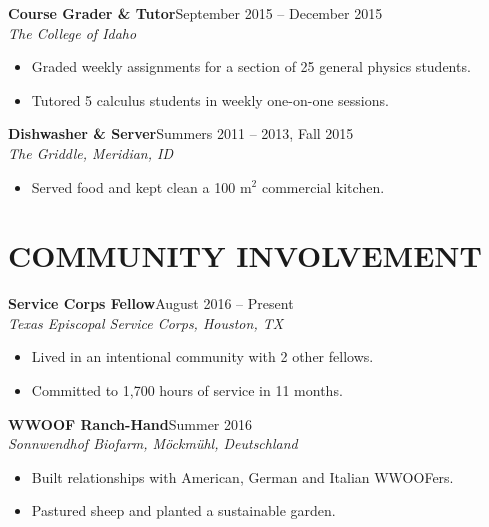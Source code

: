 \documentclass[margin]{res}
\newcommand\job[3]{\textbf{#1}\hfill {#2}\\ \emph{#3} }
\newenvironment{details}{\begin{itemize}[itemsep=0.6pt,topsep=2.3pt] }{\end{itemize} }
\begin{document}
\begin{resume}
\job{Course Grader \& Tutor}{September 2015 -- December 2015}{The College of Idaho}
	\begin{details}
        \item Graded weekly assignments for a section of 25 general physics students.
        \item Tutored 5 calculus students in weekly one-on-one sessions.
    \end{details}
              
\job{Dishwasher \& Server}{Summers 2011 -- 2013, Fall 2015}{The Griddle, Meridian, ID}
    \begin{details}
        \item Served food and kept clean a 100 $\mathrm{m}^2$ commercial kitchen.
    \end{details}    
   
\section{COMMUNITY INVOLVEMENT}
\job{Service Corps Fellow}{August 2016 -- Present}{Texas Episcopal Service Corps, Houston, TX}
	\begin{details}
    	\item Lived in an intentional community with 2 other fellows.
    	\item Committed to 1,700 hours of service in 11 months.
	\end{details}
            
\job{WWOOF Ranch-Hand}{Summer 2016}{Sonnwendhof Biofarm, M\"{o}ckm\"{u}hl, Deutschland}
    	\begin{details}
    		\item Built relationships with American, German and Italian WWOOFers.
            \item Pastured sheep and planted a sustainable garden.
     	\end{details}
            

\end{resume}
\end{document}
